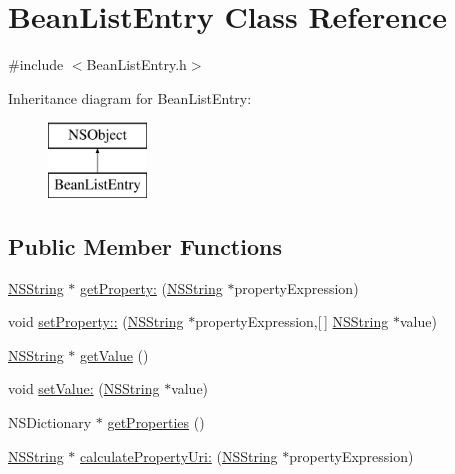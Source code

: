 \hypertarget{interface_bean_list_entry}{
\section{\-Bean\-List\-Entry \-Class \-Reference}
\label{interface_bean_list_entry}
}


{\ttfamily \#include $<$\-Bean\-List\-Entry.\-h$>$}

\-Inheritance diagram for \-Bean\-List\-Entry\-:\begin{figure}[H]
\begin{center}
\leavevmode
\includegraphics[height=2.000000cm]{interface_bean_list_entry}
\end{center}
\end{figure}
\subsection*{\-Public \-Member \-Functions}
\begin{DoxyCompactItemize}
\item 
\hyperlink{class_n_s_string}{\-N\-S\-String} $\ast$ \hyperlink{interface_bean_list_entry_ac850d8ca3c12dbb6b2adc50410bdd3bb}{get\-Property\-:} (\hyperlink{class_n_s_string}{\-N\-S\-String} $\ast$property\-Expression)
\item 
void \hyperlink{interface_bean_list_entry_a9972a43610784930962c3a07929e2894}{set\-Property\-::} (\hyperlink{class_n_s_string}{\-N\-S\-String} $\ast$property\-Expression,\mbox{[}$\,$\mbox{]} \hyperlink{class_n_s_string}{\-N\-S\-String} $\ast$value)
\item 
\hyperlink{class_n_s_string}{\-N\-S\-String} $\ast$ \hyperlink{interface_bean_list_entry_ad694f474c5c07dc3bc67a81d7aa5c9b0}{get\-Value} ()
\item 
void \hyperlink{interface_bean_list_entry_a7f11b6542664398bf1915d68ffad5793}{set\-Value\-:} (\hyperlink{class_n_s_string}{\-N\-S\-String} $\ast$value)
\item 
\-N\-S\-Dictionary $\ast$ \hyperlink{interface_bean_list_entry_a6ca1c44ff613e17ec49ff237501769be}{get\-Properties} ()
\item 
\hyperlink{class_n_s_string}{\-N\-S\-String} $\ast$ \hyperlink{interface_bean_list_entry_a38d506d6fc24e5b6158ca4ad2083daea}{calculate\-Property\-Uri\-:} (\hyperlink{class_n_s_string}{\-N\-S\-String} $\ast$property\-Expression)
\end{DoxyCompactItemize}

